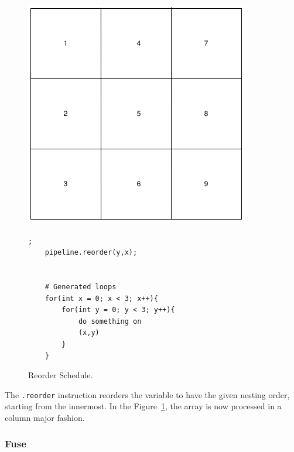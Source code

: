 \begin{figure}[H]

		\begin{minipage}[c]{\EIW}
			\centering
		\includegraphics[width=\textwidth]{Images/Reorder.png}
		\end{minipage}
		\begin{minipage}[c]{\ECW}
			\centering
\begin{lstlisting}[label={code:reorder}];
    pipeline.reorder(y,x);


	# Generated loops
	for(int x = 0; x < 3; x++){
		for(int y = 0; y < 3; y++){
			do something on
			(x,y)
		}
	}
\end{lstlisting}
		\end{minipage}
		\caption{Reorder Schedule.}
		\label{schedule:reorder}
\end{figure}
	
	The \texttt{.reorder} instruction reorders the variable to have the given nesting order, starting from the innermost. In the Figure~\ref{schedule:reorder}, the  array is now processed in a column major fashion.

	\subsubsection{Fuse}


